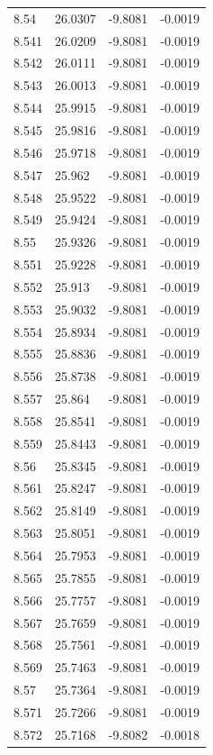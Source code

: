 \begin{tabular}{llll}
8.54 & 26.0307 & -9.8081 & -0.0019 \\
8.541 & 26.0209 & -9.8081 & -0.0019 \\
8.542 & 26.0111 & -9.8081 & -0.0019 \\
8.543 & 26.0013 & -9.8081 & -0.0019 \\
8.544 & 25.9915 & -9.8081 & -0.0019 \\
8.545 & 25.9816 & -9.8081 & -0.0019 \\
8.546 & 25.9718 & -9.8081 & -0.0019 \\
8.547 & 25.962 & -9.8081 & -0.0019 \\
8.548 & 25.9522 & -9.8081 & -0.0019 \\
8.549 & 25.9424 & -9.8081 & -0.0019 \\
8.55 & 25.9326 & -9.8081 & -0.0019 \\
8.551 & 25.9228 & -9.8081 & -0.0019 \\
8.552 & 25.913 & -9.8081 & -0.0019 \\
8.553 & 25.9032 & -9.8081 & -0.0019 \\
8.554 & 25.8934 & -9.8081 & -0.0019 \\
8.555 & 25.8836 & -9.8081 & -0.0019 \\
8.556 & 25.8738 & -9.8081 & -0.0019 \\
8.557 & 25.864 & -9.8081 & -0.0019 \\
8.558 & 25.8541 & -9.8081 & -0.0019 \\
8.559 & 25.8443 & -9.8081 & -0.0019 \\
8.56 & 25.8345 & -9.8081 & -0.0019 \\
8.561 & 25.8247 & -9.8081 & -0.0019 \\
8.562 & 25.8149 & -9.8081 & -0.0019 \\
8.563 & 25.8051 & -9.8081 & -0.0019 \\
8.564 & 25.7953 & -9.8081 & -0.0019 \\
8.565 & 25.7855 & -9.8081 & -0.0019 \\
8.566 & 25.7757 & -9.8081 & -0.0019 \\
8.567 & 25.7659 & -9.8081 & -0.0019 \\
8.568 & 25.7561 & -9.8081 & -0.0019 \\
8.569 & 25.7463 & -9.8081 & -0.0019 \\
8.57 & 25.7364 & -9.8081 & -0.0019 \\
8.571 & 25.7266 & -9.8081 & -0.0019 \\
8.572 & 25.7168 & -9.8082 & -0.0018 \\

\end{tabular}
